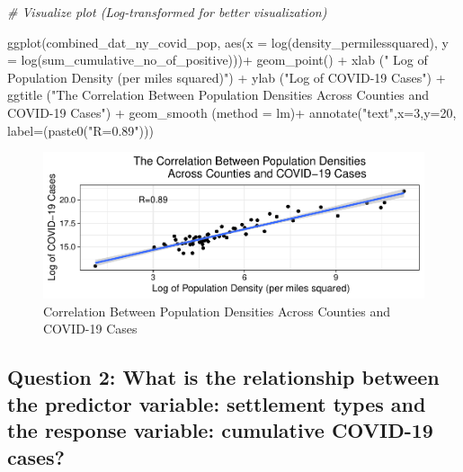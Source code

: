 \documentclass[
  12pt,
]{article}
\newenvironment{Shaded}{\begin{snugshade}}{\end{snugshade}}
\newcommand{\AttributeTok}[1]{\textcolor[rgb]{0.77,0.63,0.00}{#1}}
\newcommand{\CommentTok}[1]{\textcolor[rgb]{0.56,0.35,0.01}{\textit{#1}}}
\newcommand{\DecValTok}[1]{\textcolor[rgb]{0.00,0.00,0.81}{#1}}
\newcommand{\FunctionTok}[1]{\textcolor[rgb]{0.00,0.00,0.00}{#1}}
\newcommand{\NormalTok}[1]{#1}
\newcommand{\SpecialCharTok}[1]{\textcolor[rgb]{0.00,0.00,0.00}{#1}}
\newcommand{\StringTok}[1]{\textcolor[rgb]{0.31,0.60,0.02}{#1}}
\begin{document}
\begin{Shaded}
\begin{Highlighting}[]
\CommentTok{\# Visualize plot (Log{-}transformed for better visualization)}

\FunctionTok{ggplot}\NormalTok{(combined\_dat\_ny\_covid\_pop, }\FunctionTok{aes}\NormalTok{(}\AttributeTok{x =} \FunctionTok{log}\NormalTok{(density\_permilessquared), }\AttributeTok{y =} \FunctionTok{log}\NormalTok{(sum\_cumulative\_no\_of\_positive)))}\SpecialCharTok{+}
  \FunctionTok{geom\_point}\NormalTok{() }\SpecialCharTok{+}
  \FunctionTok{xlab}\NormalTok{ (}\StringTok{" Log of Population Density (per miles squared)"}\NormalTok{) }\SpecialCharTok{+}
  \FunctionTok{ylab}\NormalTok{ (}\StringTok{"Log of COVID{-}19 Cases"}\NormalTok{) }\SpecialCharTok{+}
  \FunctionTok{ggtitle}\NormalTok{ (}\StringTok{"The Correlation Between Population Densities}
\StringTok{           Across Counties and COVID{-}19 Cases"}\NormalTok{) }\SpecialCharTok{+}
  \FunctionTok{geom\_smooth}\NormalTok{ (}\AttributeTok{method =} \StringTok{\textquotesingle{}lm\textquotesingle{}}\NormalTok{)}\SpecialCharTok{+}
  \FunctionTok{annotate}\NormalTok{(}\StringTok{"text"}\NormalTok{,}\AttributeTok{x=}\DecValTok{3}\NormalTok{,}\AttributeTok{y=}\DecValTok{20}\NormalTok{, }\AttributeTok{label=}\NormalTok{(}\FunctionTok{paste0}\NormalTok{(}\StringTok{"R=0.89"}\NormalTok{)))}
\end{Highlighting}
\end{Shaded}

\begin{figure}

\includegraphics{EDA_Final_Group_Project_files/figure-latex/unnamed-chunk-19-1} \hfill{}

\caption{Correlation Between Population Densities Across Counties and COVID-19 Cases}\label{fig:unnamed-chunk-19}
\end{figure}

\hypertarget{question-2-what-is-the-relationship-between-the-predictor-variable-settlement-types-and-the-response-variable-cumulative-covid-19-cases}{%
\subsection{Question 2: What is the relationship between the predictor
variable: settlement types and the response variable: cumulative
COVID-19
cases?}\label{question-2-what-is-the-relationship-between-the-predictor-variable-settlement-types-and-the-response-variable-cumulative-covid-19-cases}}
\end{document}
